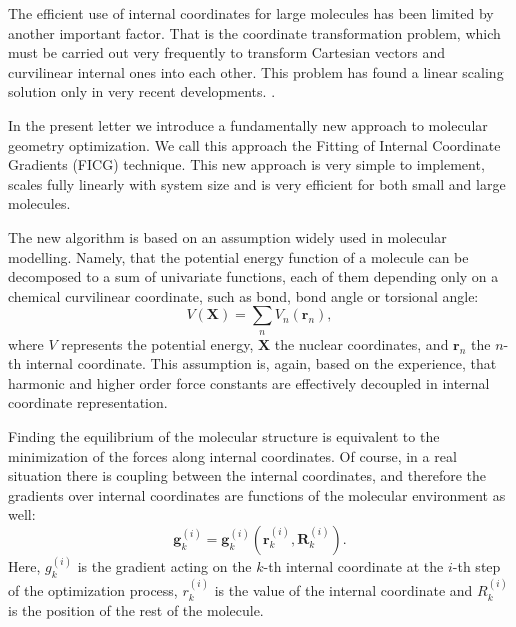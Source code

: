 \documentclass[prl,aps,twocolumn,showpacs,twocolumngrid,superbib]{revtex4}
\newcommand{\bms}[1]{{\boldsymbol #1}}
\begin{document}
The efficient use of internal coordinates for large molecules has 
been limited by another important factor. That is the coordinate
transformation problem, which must be carried out very frequently
to transform Cartesian vectors and curvilinear internal ones into each
other. This problem has found a linear scaling solution   
only in very recent developments. 
\cite{paizs_coordtrf1,nemeth_coordtrf1,paizs_coordtrf2,nemeth_coordtrf2,billeter_coordtrf,andzelm_coordtrf,kudin_coordtrf}. 

In the present letter we introduce a fundamentally new approach
to molecular geometry optimization. We call this approach the
Fitting of Internal Coordinate Gradients
(FICG) technique. This new approach is very simple
to implement, scales fully linearly with system size 
and is very efficient for both small and large molecules.

The new algorithm is based on an assumption widely used in molecular 
modelling. Namely, that
the potential energy function of a molecule can be decomposed to a sum
of univariate functions, each of them depending only on a   
chemical curvilinear coordinate, such as bond, bond angle
or torsional angle: 
\begin{equation}
V(\bms{X}) = \sum_{n} V_{n}(\bms{r}_{n}) ,
\end{equation}
where $V$ represents the potential energy, $\bms{X}$ the nuclear
coordinates, and $\bms{r}_{n}$ the $n$-th internal coordinate.
This assumption is, again, based on the
experience, that harmonic and higher order force constants are
effectively decoupled in internal coordinate representation.

Finding the equilibrium of the molecular
structure is equivalent to the minimization of the forces along internal
coordinates. Of course, in a real situation there is coupling
between the internal coordinates, and therefore the gradients over
internal coordinates are functions of the molecular environment as well:
\begin{equation}
\bms{g}_{k}^{(i)} = \bms{g}_{k}^{(i)}\left( \bms{r}_{k}^{(i)},\bms{R}_{k}^{(i)} \right) .
\end{equation}
Here, $g_{k}^{(i)}$ is the gradient acting 
on the $k$-th internal coordinate
at the $i$-th step of the optimization process, $r_{k}^{(i)}$ is 
the value of the internal coordinate and $R_{k}^{(i)}$ is the position
of the rest of the molecule. 
\end{document}
